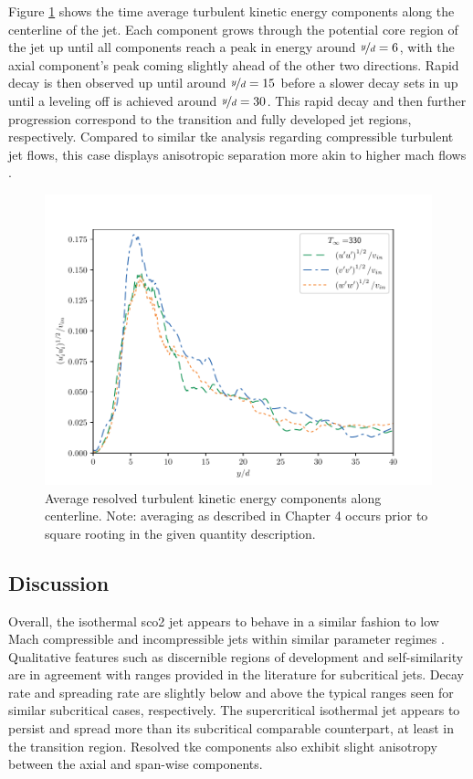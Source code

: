 Figure \ref{330_TKE_features} shows the time average turbulent kinetic energy components along the centerline of the jet. Each component grows through the potential core region of the jet up until all components reach a peak in energy around $\nicefrac{y}{d}=6$, with the axial component's peak coming slightly ahead of the other two directions. Rapid decay is then observed up until around $\nicefrac{y}{d} = 15$ before a slower decay sets in up until a leveling off is achieved around $\nicefrac{y}{d} = 30$. This rapid decay and then further progression correspond to the transition and fully developed jet regions, respectively. Compared to similar \gls{tke} analysis regarding compressible turbulent jet flows, this case displays anisotropic separation more akin to higher mach flows \cite{iso_comp_2}.

\begin{figure}[hbtp!]
\begin{center}
	\includegraphics[scale=.7]{figures/Plots/centerline/330_TKEuvw_centerline.pdf}
	\caption{Average resolved turbulent kinetic energy components along centerline. Note: averaging as described in Chapter 4 occurs prior to square rooting in the given quantity description.} \label{330_TKE_features}
\end{center}
\end{figure}

\subsection{Discussion}
Overall, the isothermal \gls{sco2} jet appears to behave in a similar fashion to low Mach compressible and incompressible jets within similar parameter regimes \cite{iso_comp_1, iso_comp_1_ref_1, iso_comp_2, Pope}. Qualitative features such as discernible regions of development and self-similarity are in agreement with ranges provided in the literature for subcritical jets. Decay rate and spreading rate are slightly below and above the typical ranges seen for similar subcritical cases, respectively. The supercritical isothermal jet appears to persist and spread more than its subcritical comparable counterpart, at least in the transition region. Resolved \gls{tke} components also exhibit slight anisotropy between the axial and span-wise components. 

